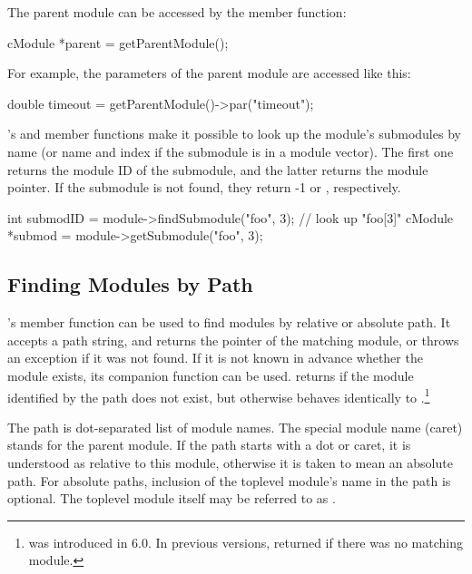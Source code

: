 \begin{ned}
The parent module can be accessed by the 
member function:

\begin{cpp}
cModule *parent = getParentModule();
\end{cpp}

For example, the parameters of the parent module are accessed
like this:

\begin{cpp}
double timeout = getParentModule()->par("timeout");
\end{cpp}

's  and 
member functions make it possible to look up the module's submodules
by name (or name and index if the submodule
is in a module vector). The first one returns the module ID of
the submodule, and the latter returns the module pointer. If the
submodule is not found, they return -1 or , respectively.

\begin{cpp}
int submodID = module->findSubmodule("foo", 3); // look up "foo[3]"
cModule *submod = module->getSubmodule("foo", 3);
\end{cpp}


\subsection{Finding Modules by Path}
\label{sec:simple-modules:finding-modules-by-path}

's  member function can be used to
find modules by relative or absolute path. It accepts a path string, and
returns the pointer of the matching module, or throws an exception if it
was not found. If it is not known in advance whether the module exists,
its companion function  can be used.
 returns  if the module
identified by the path does not exist, but otherwise behaves identically
to .\footnote{ was
introduced in {\omnetpp} 6.0. In previous versions, 
returned  if there was no matching module.}

The path is dot-separated list of module names. The special module name
\ttt{\textasciicircum} (caret) stands for the parent module. If the path
starts with a dot or caret, it is understood as relative to this module,
otherwise it is taken to mean an absolute path. For absolute paths,
inclusion of the toplevel module's name in the path is optional.
The toplevel module itself may be referred to as .


\end{ned}
